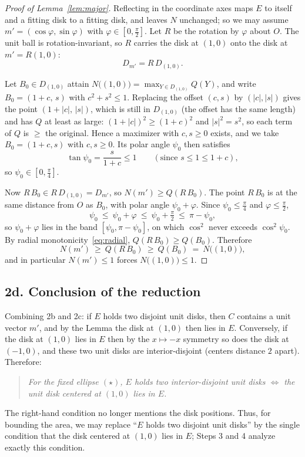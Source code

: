 \documentclass[11pt]{article}
\begin{document}
\begin{proof}[Proof of Lemma~\ref{lem:major}]
Reflecting in the coordinate axes maps $E$ to itself and a fitting disk to a fitting disk, and leaves
$N$ unchanged; so we may assume $m'=(\cos\varphi,\sin\varphi)$ with $\varphi\in[0,\tfrac\pi2]$. Let $R$
be the rotation by $\varphi$ about $O$. The unit ball is rotation-invariant, so $R$ carries the disk at
$(1,0)$ onto the disk at $m'=R(1,0)$:
\[
  D_{m'}=R\,D_{(1,0)} .
\]

Let $B_0\in D_{(1,0)}$ attain $N\bigl((1,0)\bigr)=\max_{Y\in D_{(1,0)}}Q(Y)$, and write
$B_0=(1+c,\,s)$ with $c^2+s^2\le1$. Replacing the offset $(c,s)$ by $(|c|,|s|)$ gives the point
$(1+|c|,\,|s|)$, which is still in $D_{(1,0)}$ (the offset has the same length) and has $Q$ at least as
large: $(1+|c|)^2\ge(1+c)^2$ and $|s|^2=s^2$, so each term of $Q$ is $\ge$ the original. Hence a
maximizer with $c,s\ge0$ exists, and we take $B_0=(1+c,s)$ with $c,s\ge0$. Its polar angle $\psi_0$
then satisfies
\[
  \tan\psi_0=\frac{s}{1+c}\le1\qquad(\text{since }s\le1\le1+c),
\]
so $\psi_0\in[0,\tfrac\pi4]$.

Now $R\,B_0\in R\,D_{(1,0)}=D_{m'}$, so $N(m')\ge Q(R\,B_0)$. The point $R\,B_0$ is at the same distance
from $O$ as $B_0$, with polar angle $\psi_0+\varphi$. Since $\psi_0\le\tfrac\pi4$ and $\varphi\le\tfrac\pi2$,
\[
  \psi_0\ \le\ \psi_0+\varphi\ \le\ \psi_0+\tfrac\pi2\ \le\ \pi-\psi_0 ,
\]
so $\psi_0+\varphi$ lies in the band $[\psi_0,\pi-\psi_0]$, on which $\cos^2$ never exceeds
$\cos^2\psi_0$. By radial monotonicity~\eqref{eq:radial}, $Q(R\,B_0)\ge Q(B_0)$. Therefore
\[
  N(m')\ \ge\ Q(R\,B_0)\ \ge\ Q(B_0)\ =\ N\bigl((1,0)\bigr),
\]
and in particular $N(m')\le1$ forces $N\bigl((1,0)\bigr)\le1$.
\end{proof}

\subsection*{2d. Conclusion of the reduction}

Combining 2b and 2c: if $E$ holds two disjoint unit disks, then $C$ contains a unit vector
$m'$, and by the Lemma the disk at $(1,0)$ then lies in $E$. Conversely, if the disk at
$(1,0)$ lies in $E$ then by the $x\mapsto-x$ symmetry so does the disk at $(-1,0)$, and these
two unit disks are interior-disjoint (centers distance $2$ apart). Therefore:
\begin{quote}
\itshape
For the fixed ellipse $(\star)$, $E$ holds two interior-disjoint unit disks
$\iff$ the unit disk centered at $(1,0)$ lies in $E$.
\end{quote}
The right-hand condition no longer mentions the disk positions. Thus, for bounding the area, we may
replace ``$E$ holds two disjoint unit disks'' by the single condition that the disk centered at
$(1,0)$ lies in $E$; Steps 3 and 4 analyze exactly this condition.
\end{document}

